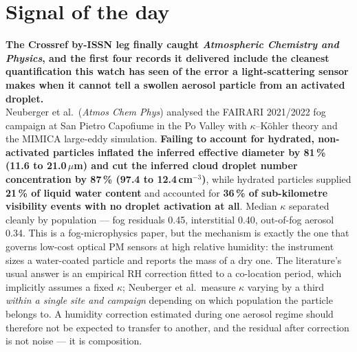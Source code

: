 \documentclass[10pt]{article}
\begin{document}
\vspace{6mm}

\section*{\sffamily\bfseries\color{Deep}Signal of the day}
\vspace{-1.5mm}{\color{Amber}\rule{\linewidth}{1.1pt}}\vspace{2.5mm}

\begin{keybox}
{\sffamily\bfseries\small\color{Deep}The Crossref by-ISSN leg finally caught
\textit{Atmospheric Chemistry and Physics}, and the first four records it delivered
include the cleanest quantification this watch has seen of the error a light-scattering
sensor makes when it cannot tell a swollen aerosol particle from an activated droplet.}\\[1.4mm]
\footnotesize
Neuberger et al.\ (\textit{Atmos Chem Phys}) analysed the FAIRARI 2021/2022 fog campaign
at San Pietro Capofiume in the Po Valley with $\kappa$--K\"ohler theory and the MIMICA
large-eddy simulation. \textbf{Failing to account for hydrated, non-activated particles
inflated the inferred effective diameter by 81\,\% (11.6 to 21.0\,$\mu$m) and cut the
inferred cloud droplet number concentration by 87\,\% (97.4 to 12.4\,cm$^{-3}$)}, while
hydrated particles supplied \textbf{21\,\% of liquid water content} and accounted for
\textbf{36\,\% of sub-kilometre visibility events with no droplet activation at all}.
Median $\kappa$ separated cleanly by population --- fog residuals 0.45, interstitial
0.40, out-of-fog aerosol 0.34. This is a fog-microphysics paper, but the mechanism is
exactly the one that governs low-cost optical PM sensors at high relative humidity: the
instrument sizes a water-coated particle and reports the mass of a dry one. The
literature's usual answer is an empirical RH correction fitted to a co-location period,
which implicitly assumes a fixed $\kappa$; Neuberger et al.\ measure $\kappa$ varying by
a third \emph{within a single site and campaign} depending on which population the
particle belongs to. A humidity correction estimated during one aerosol regime should
therefore not be expected to transfer to another, and the residual after correction is
not noise --- it is composition.
\end{keybox}

\vspace{3mm}
\end{document}
